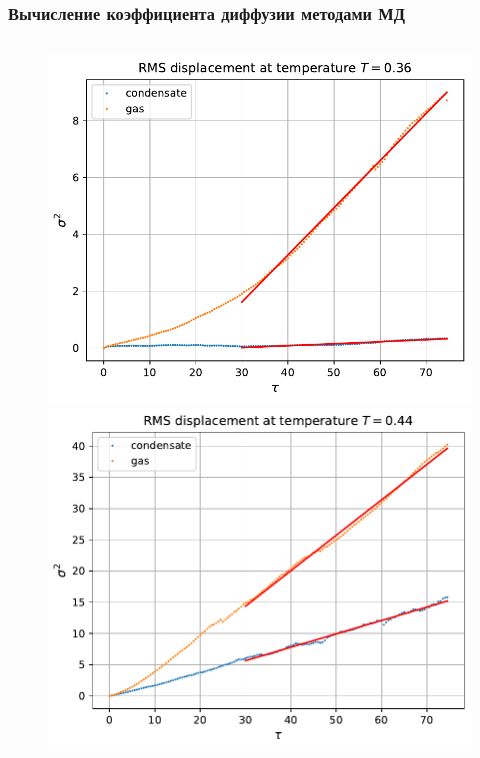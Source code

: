 \documentclass[pdf,hyperref={unicode}]{beamer}
\begin{document}
\begin{frame}
\transdissolve[duration=0.2]
\frametitle{Вычисление коэффициента диффузии методами МД}

\begin{columns}

\begin{column}{0.6\linewidth}

\begin{figure}[h]
\begin{center}
\begin{minipage}[h]{0.45\linewidth}
\includegraphics[width=\textwidth, keepaspectratio]{diffusion_fit_0.36}
\end{minipage}
\begin{minipage}[h]{0.45\linewidth}
\includegraphics[width=\textwidth, keepaspectratio]{diffusion_fit_0.44}
\end{minipage}


\end{center}
\end{figure}
\end{column}
\end{columns}
\end{frame}
\end{document}
